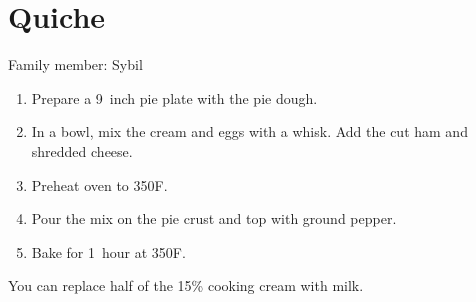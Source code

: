 \chapter{Quiche}
\label{ch:hamquiche}



Family member: Sybil

\begin{enumerate}
    \item Prepare a 9~inch pie plate with the pie dough.
    \item In a bowl, mix the cream and eggs with a whisk. Add the cut ham and shredded cheese.
    \item Preheat oven to 350\degree F.
    \item Pour the mix on the pie crust and top with ground pepper.
    \item Bake for 1~hour at 350\degree F.
\end{enumerate}

You can replace half of the 15\% cooking cream with milk.
